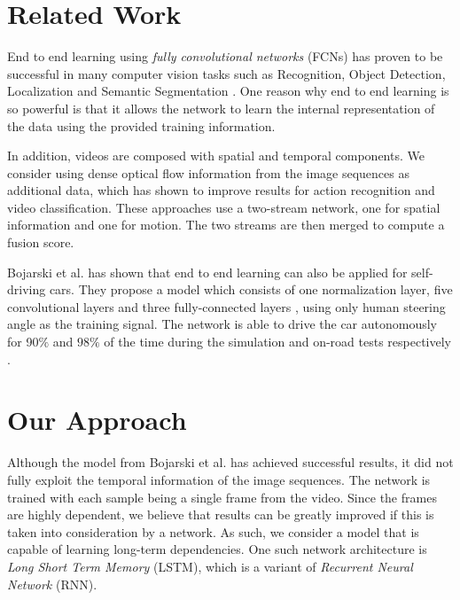 \documentclass[10pt,twocolumn,letterpaper]{article}
\begin{document}
\section{Related Work}
End to end learning using {\em fully convolutional networks} (FCNs) has proven to be successful in many computer vision tasks such as Recognition\cite{DBLP:journals/corr/SermanetEZMFL13}, Object Detection\cite{DBLP:journals/corr/SermanetEZMFL13}, Localization\cite{DBLP:journals/corr/SermanetEZMFL13, conf/cvpr/OquabBLS15} and Semantic Segmentation \cite{DBLP:journals/pami/ShelhamerLD17}. One reason why end to end learning is so powerful is that it allows the network to learn the internal representation of the data using the provided training information.

In addition, videos are composed with spatial and temporal components. We consider using dense optical flow information from the image sequences as additional data, which has shown to improve results for action recognition\cite{DBLP:conf/nips/SimonyanZ14} and video classification\cite{DBLP:conf/cvpr/NgHVVMT15}. These approaches use a two-stream network, one for spatial information and one for motion. The two streams are then merged to compute a fusion score.

Bojarski et al.\cite{DBLP:journals/corr/BojarskiTDFFGJM16} has shown that end to end learning can also be applied for self-driving cars. They propose a model which consists of one normalization layer, five convolutional layers and three fully-connected layers \cite{DBLP:journals/corr/BojarskiTDFFGJM16}, using only human steering angle as the training signal. The network is able to drive the car autonomously for 90$\%$ and $98\%$ of the time during the simulation and on-road tests respectively \cite{DBLP:journals/corr/BojarskiTDFFGJM16}.

\section{Our Approach}
Although the model from Bojarski et al.\cite{DBLP:journals/corr/BojarskiTDFFGJM16} has achieved successful results, it did not fully exploit the temporal information of the image sequences. The network is trained with each sample being a single frame from the video. Since the frames are highly dependent, we believe that results can be greatly improved if this is taken into consideration by a network. As such, we consider a model that is capable of learning long-term dependencies. One such network architecture is {\em Long Short Term Memory} (LSTM)\cite{DBLP:journals/neco/HochreiterS97}, which is a variant of {\em Recurrent Neural Network} (RNN). 
\end{document}
